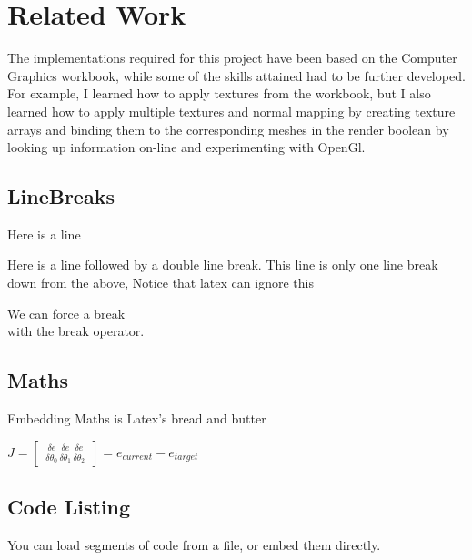 \documentclass[10pt, a4paper]{article}
\begin{document}
    
	
	\section{Related Work}
	\iffalse
	\paragraph{Formatting}
	Some common formatting you may need uses these commands for \textbf{Bold Text}, \textit{Italics}, and \underline{underlined}.
	\fi
	
	The implementations required for this project have been based on the Computer Graphics workbook, while some of the skills attained had to be further developed. For example, I learned how to apply textures from the workbook, but I also learned how to apply multiple textures and normal mapping by creating texture arrays and binding them to the corresponding meshes in the render boolean by looking up information on-line and experimenting with OpenGl.
	
	\iffalse
	
	\subsection{LineBreaks}
	Here is a line
    
    Here is a line followed by a double line break.
	This line is only one line break down from the above, Notice that latex can ignore this
    
    We can force a break \\ with the break operator.
    
	\subsection{Maths}
    Embedding Maths is Latex's bread and butter    
    
    {\centering \Large \(
        J = \begin{bmatrix}
            \frac{\delta e}{\delta \theta _0}
            \frac{\delta e}{\delta \theta _1}
            \frac{\delta e}{\delta \theta _2}
        \end{bmatrix}
        = e_{current} - e_{target} 
    \)\par}
	
	\subsection{Code Listing}
    You can load segments of code from a file, or embed them directly.
    
\end{document}

